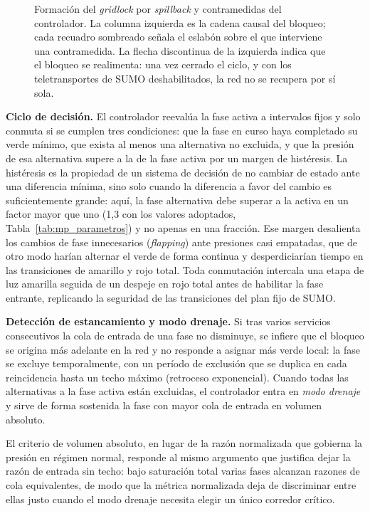 \begin{figure}[ht]
\begin{tikzpicture}[>=latex]
\end{tikzpicture}
\shorthandon{>}
\caption{Formación del \emph{gridlock} por \emph{spillback} y contramedidas del controlador. La columna izquierda es la cadena causal del bloqueo; cada recuadro sombreado señala el eslabón sobre el que interviene una contramedida. La flecha discontinua de la izquierda indica que el bloqueo se realimenta: una vez cerrado el ciclo, y con los teletransportes de SUMO deshabilitados, la red no se recupera por sí sola.}
\label{fig:gridlock_spillback}
\end{figure}

\textbf{Ciclo de decisión.} El controlador reevalúa la fase activa a intervalos fijos y solo conmuta si se cumplen tres condiciones: que la fase en curso haya completado su verde mínimo, que exista al menos una alternativa no excluida, y que la presión de esa alternativa supere a la de la fase activa por un margen de histéresis. La histéresis es la propiedad de un sistema de decisión de no cambiar de estado ante una diferencia mínima, sino solo cuando la diferencia a favor del cambio es suficientemente grande: aquí, la fase alternativa debe superar a la activa en un factor mayor que uno (1,3 con los valores adoptados, Tabla~\ref{tab:mp_parametros}) y no apenas en una fracción. Ese margen desalienta los cambios de fase innecesarios (\emph{flapping}) ante presiones casi empatadas, que de otro modo harían alternar el verde de forma continua y desperdiciarían tiempo en las transiciones de amarillo y rojo total. Toda conmutación intercala una etapa de luz amarilla seguida de un despeje en rojo total antes de habilitar la fase entrante, replicando la seguridad de las transiciones del plan fijo de SUMO.

\textbf{Detección de estancamiento y modo drenaje.} Si tras varios servicios consecutivos la cola de entrada de una fase no disminuye, se infiere que el bloqueo se origina más adelante en la red y no responde a asignar más verde local: la fase se excluye temporalmente, con un período de exclusión que se duplica en cada reincidencia hasta un techo máximo (retroceso exponencial). Cuando todas las alternativas a la fase activa están excluidas, el controlador entra en \emph{modo drenaje} y sirve de forma sostenida la fase con mayor cola de entrada en volumen absoluto.

El criterio de volumen absoluto, en lugar de la razón normalizada que gobierna la presión en régimen normal, responde al mismo argumento que justifica dejar la razón de entrada sin techo: bajo saturación total varias fases alcanzan razones de cola equivalentes, de modo que la métrica normalizada deja de discriminar entre ellas justo cuando el modo drenaje necesita elegir un único corredor crítico.

